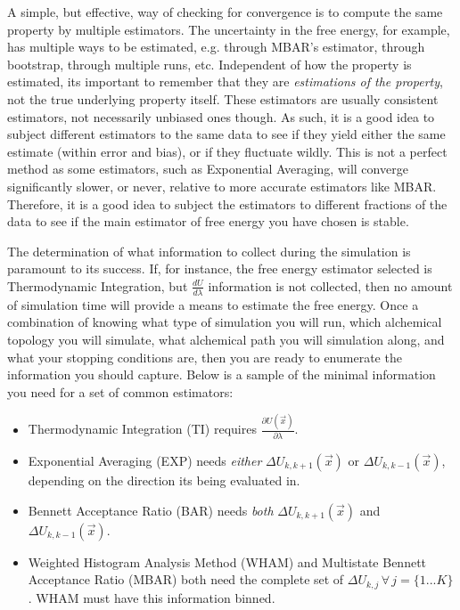 \documentclass[9pt,bestpractices]{livecoms}
\begin{document}
A simple, but effective, way of checking for convergence is to compute the same property by multiple estimators. 
The uncertainty in the free energy, for example, has multiple ways to be estimated, e.g. through MBAR's estimator, through bootstrap, through multiple runs, etc. 
Independent of how the property is estimated, its important to remember that they are \textit{estimations of the property}, not the true underlying property itself. 
These estimators are usually consistent estimators, not necessarily unbiased ones though.
As such, it is a good idea to subject different estimators to the same data to see if they yield either the same estimate (within error and bias), or if they fluctuate wildly. 
This is not a perfect method as some estimators, such as Exponential Averaging, will converge significantly slower, or never, relative to more accurate estimators like MBAR. 
Therefore, it is a good idea to subject the estimators to different fractions of the data to see if the main estimator of free energy you have chosen is stable.


The determination of what information to collect during the simulation is paramount to its success. If, for instance, the free energy estimator selected is Thermodynamic Integration, but $\frac{dU}{d\lambda}$ information is not collected, then no amount of simulation time will provide a means to estimate the free energy. Once a combination of knowing what type of simulation you will run, which alchemical topology you will simulate, what alchemical path you will simulation along, and what your stopping conditions are, then you are ready to enumerate the information you should capture. Below is a sample of the minimal information you need for a set of common estimators:

\begin{itemize}
    \item Thermodynamic Integration (TI) requires $\frac{\partial U(\vec{x})}{\partial\lambda}$.
    \item Exponential Averaging (EXP) needs \textit{either} $\Delta U_{k,k+1}(\vec{x})$ or $\Delta U_{k,k-1}(\vec{x})$, depending on the direction its being evaluated in.
    \item Bennett Acceptance Ratio (BAR) needs \textit{both} $\Delta U_{k,k+1}(\vec{x})$ and $\Delta U_{k,k-1}(\vec{x})$.
    \item Weighted Histogram Analysis Method (WHAM) and Multistate Bennett Acceptance Ratio (MBAR) both need the complete set of $\Delta U_{k,j} \, \forall \, j=\{1...K\}$. WHAM must have this information binned.
\end{itemize}
\end{document}

